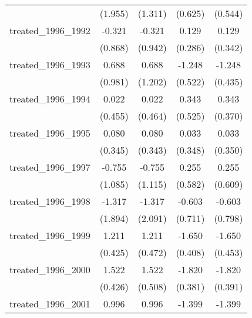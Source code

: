 {\begin{tabular}{l*{4}{c}}
            &     (1.955)         &     (1.311)         &     (0.625)         &     (0.544)         \\
[1em]
treated\_1996\_1992&      -0.321         &      -0.321         &       0.129         &       0.129         \\
            &     (0.868)         &     (0.942)         &     (0.286)         &     (0.342)         \\
[1em]
treated\_1996\_1993&       0.688         &       0.688         &      -1.248\sym{*}  &      -1.248\sym{**} \\
            &     (0.981)         &     (1.202)         &     (0.522)         &     (0.435)         \\
[1em]
treated\_1996\_1994&       0.022         &       0.022         &       0.343         &       0.343         \\
            &     (0.455)         &     (0.464)         &     (0.525)         &     (0.370)         \\
[1em]
treated\_1996\_1995&       0.080         &       0.080         &       0.033         &       0.033         \\
            &     (0.345)         &     (0.343)         &     (0.348)         &     (0.350)         \\
[1em]
treated\_1996\_1997&      -0.755         &      -0.755         &       0.255         &       0.255         \\
            &     (1.085)         &     (1.115)         &     (0.582)         &     (0.609)         \\
[1em]
treated\_1996\_1998&      -1.317         &      -1.317         &      -0.603         &      -0.603         \\
            &     (1.894)         &     (2.091)         &     (0.711)         &     (0.798)         \\
[1em]
treated\_1996\_1999&       1.211\sym{**} &       1.211\sym{*}  &      -1.650\sym{***}&      -1.650\sym{***}\\
            &     (0.425)         &     (0.472)         &     (0.408)         &     (0.453)         \\
[1em]
treated\_1996\_2000&       1.522\sym{***}&       1.522\sym{**} &      -1.820\sym{***}&      -1.820\sym{***}\\
            &     (0.426)         &     (0.508)         &     (0.381)         &     (0.391)         \\
[1em]
treated\_1996\_2001&       0.996\sym{*}  &       0.996\sym{*}  &      -1.399\sym{***}&      -1.399\sym{**} \\

\end{tabular}}
